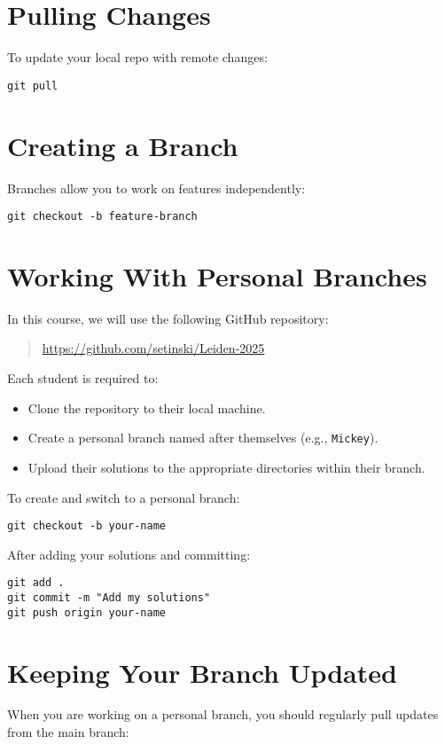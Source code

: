 \documentclass[11pt]{article}
\begin{document}
\section{Pulling Changes}
To update your local repo with remote changes:

\begin{lstlisting}
git pull
\end{lstlisting}

\section{Creating a Branch}
Branches allow you to work on features independently:

\begin{lstlisting}
git checkout -b feature-branch
\end{lstlisting}

\section{Working With Personal Branches}
In this course, we will use the following GitHub repository:

\begin{quote}
\url{https://github.com/setinski/Leiden-2025} 
\end{quote}

\noindent Each student is required to:

\begin{itemize}
    \item Clone the repository to their local machine.
    \item Create a personal branch named after themselves (e.g., \texttt{Mickey}).
    \item Upload their solutions to the appropriate directories within their branch.
\end{itemize}

\noindent To create and switch to a personal branch:

\begin{lstlisting}
git checkout -b your-name
\end{lstlisting}

\noindent After adding your solutions and committing:

\begin{lstlisting}
git add .
git commit -m "Add my solutions"
git push origin your-name
\end{lstlisting}

\section{Keeping Your Branch Updated}
When you are working on a personal branch, you should regularly pull updates from the main branch:
\end{document}
